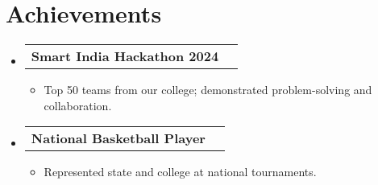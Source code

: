 \documentclass[letterpaper,11pt]{article}
\makeatletter
\newcommand{\resumeItem}[1]{\item\small{#1 \vspace{-2pt}}}
\newcommand{\resumeProjectHeading}[2]{\item\begin{tabular*}{0.98\textwidth}{l@{\extracolsep{\fill}}r}\small\bfseries#1 & \small#2 \end{tabular*}\vspace{-5pt}}
\newcommand{\resumeSubHeadingListStart}{\begin{itemize}[leftmargin=0.1in, label={}]}
\newcommand{\resumeSubHeadingListEnd}{\end{itemize}\vspace{-5pt}}
\newcommand{\resumeItemListStart}{\begin{itemize}}
\newcommand{\resumeItemListEnd}{\end{itemize}\vspace{-5pt}}
\makeatother
\begin{document}
\section{Achievements}
\resumeSubHeadingListStart
    \resumeProjectHeading{\textbf{Smart India Hackathon 2024}}{}
    \resumeItemListStart
        \resumeItem{Top 50 teams from our college; demonstrated problem-solving and collaboration.}
    \resumeItemListEnd
    \resumeProjectHeading{\textbf{National Basketball Player}}{}
    \resumeItemListStart
        \resumeItem{Represented state and college at national tournaments.}
    \resumeItemListEnd
\resumeSubHeadingListEnd
\end{document}
